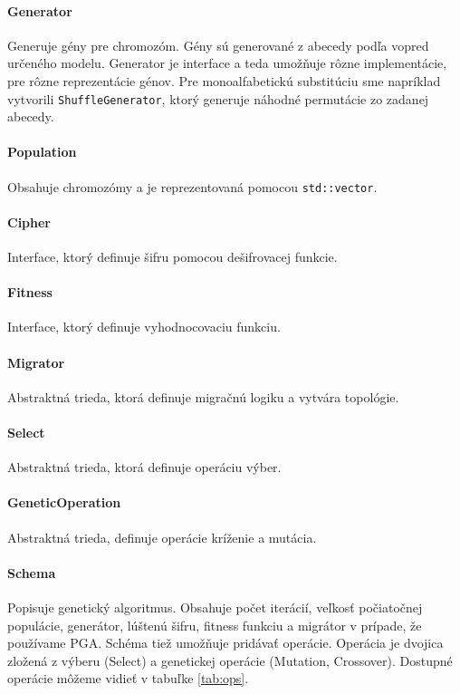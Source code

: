 \paragraph{Generator} Generuje gény pre chromozóm. Gény sú generované z abecedy podľa vopred určeného modelu.
Generator je interface a teda umožňuje rôzne implementácie, pre rôzne reprezentácie génov.
Pre monoalfabetickú substitúciu sme napríklad vytvorili \texttt{ShuffleGenerator}, ktorý generuje náhodné permutácie zo zadanej abecedy.
\paragraph{Population} Obsahuje chromozómy a je reprezentovaná pomocou \texttt{std::vector}.
\paragraph{Cipher} Interface, ktorý definuje šifru pomocou dešifrovacej funkcie.
\paragraph{Fitness} Interface, ktorý definuje vyhodnocovaciu funkciu.
\paragraph{Migrator} Abstraktná trieda, ktorá definuje migračnú logiku a vytvára topológie.
\paragraph{Select} Abstraktná trieda, ktorá definuje operáciu výber.
\paragraph{GeneticOperation} Abstraktná trieda, definuje operácie kríženie a mutácia.
\paragraph{Schema} Popisuje genetický algoritmus.
Obsahuje počet iterácií, veľkosť počiatočnej populácie, generátor, lúštenú šifru, fitness funkciu a migrátor v prípade, že používame PGA.
Schéma tiež umožňuje pridávať operácie.
Operácia je dvojica zložená z výberu (Select) a genetickej operácie (Mutation, Crossover).
Dostupné operácie môžeme vidieť v tabuľke \ref{tab:ops}.

